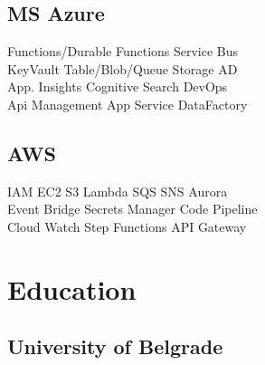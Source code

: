 \documentclass[letterpaper]{cv_12} %
\begin{document}
\begin{minipage}[t]{0.39\textwidth}
    \subsection{MS Azure}

    Functions/Durable Functions \textbullet{} Service Bus\\
    KeyVault \textbullet{} Table/Blob/Queue Storage \textbullet{} AD\\
    App. Insights \textbullet{} Cognitive Search \textbullet{} DevOps\\
    Api Management \textbullet{} App Service \textbullet{} DataFactory

    \sectionspace%

    \subsection{AWS}

    IAM \textbullet{} EC2 \textbullet{} S3 \textbullet{} Lambda
    \textbullet{} SQS \textbullet{} SNS \textbullet{} Aurora\\
    Event Bridge \textbullet{} Secrets Manager \textbullet{} Code
    Pipeline\\
    Cloud Watch \textbullet{} Step Functions \textbullet{} API Gateway

    \sectionspace%


    \section{Education}

    \subsection{University of Belgrade}


    \sectionspace%


    \sectionspace%


\end{minipage} %
\end{document}
